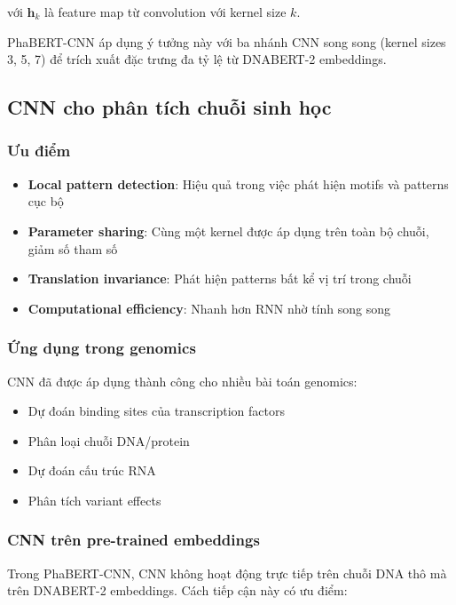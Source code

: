 với $\mathbf{h}_k$ là feature map từ convolution với kernel size $k$.

PhaBERT-CNN áp dụng ý tưởng này với ba nhánh CNN song song (kernel sizes 3, 5, 7) để trích xuất đặc trưng đa tỷ lệ từ DNABERT-2 embeddings.

\subsection{CNN cho phân tích chuỗi sinh học}

\subsubsection{Ưu điểm}

\begin{itemize}
    \item \textbf{Local pattern detection}: Hiệu quả trong việc phát hiện motifs và patterns cục bộ
    \item \textbf{Parameter sharing}: Cùng một kernel được áp dụng trên toàn bộ chuỗi, giảm số tham số
    \item \textbf{Translation invariance}: Phát hiện patterns bất kể vị trí trong chuỗi
    \item \textbf{Computational efficiency}: Nhanh hơn RNN nhờ tính song song
\end{itemize}

\subsubsection{Ứng dụng trong genomics}

CNN đã được áp dụng thành công cho nhiều bài toán genomics:
\begin{itemize}
    \item Dự đoán binding sites của transcription factors
    \item Phân loại chuỗi DNA/protein
    \item Dự đoán cấu trúc RNA
    \item Phân tích variant effects
\end{itemize}

\subsubsection{CNN trên pre-trained embeddings}

Trong PhaBERT-CNN, CNN không hoạt động trực tiếp trên chuỗi DNA thô mà trên DNABERT-2 embeddings. Cách tiếp cận này có ưu điểm:

